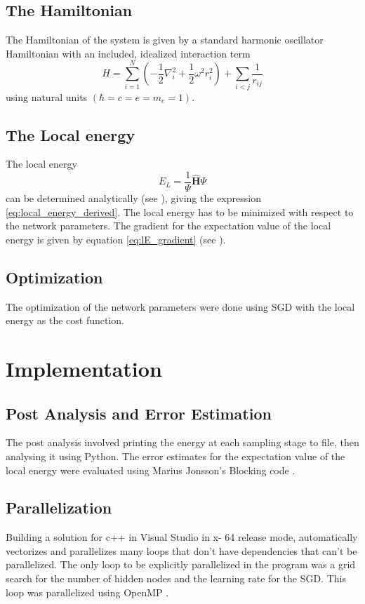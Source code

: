 \documentclass[11pt,a4paper,titlepage]{article}
\begin{document}
\subsection{The Hamiltonian}
The Hamiltonian of the system is given by a standard harmonic oscillator Hamiltonian with an included, idealized interaction term
\begin{equation}\label{eq:hamiltonian}
\hat{H}=\sum_{i=1}^{N}\left(-\frac{1}{2} \nabla_{i}^{2}+\frac{1}{2} \omega^{2} r_{i}^{2}\right)+\sum_{i<j} \frac{1}{r_{i j}}
\end{equation}
using natural units $\left(\hbar=c=e=m_{e}=1\right)$.
\subsection{The Local energy }
The local energy
\begin{equation}
E_{L}=\frac{1}{\Psi} \hat{\mathbf{H}} \Psi
\end{equation}
can be determined analytically (see ), giving the expression \eqref{eq:local_energy_derived}. The local energy has to be minimized with respect to the network parameters. The gradient for the expectation value of the local energy is given by equation \eqref{eq:lE_gradient} (see ).
\subsection{Optimization}
The optimization of the network parameters were done using SGD with the local energy as the cost function.

\section{Implementation}

\subsection{Post Analysis and Error Estimation}
The post analysis involved printing the energy at each sampling stage to file, then analysing it using Python. The error estimates for the expectation value of the local energy were evaluated using Marius Jonsson's Blocking code \cite{PhysRevE.98.043304}.
\subsection{Parallelization}
Building a solution for c++ in Visual Studio in x- 64 release mode, automatically vectorizes and parallelizes many loops that don't have dependencies that can't be parallelized. The only loop to be explicitly parallelized in the program was a grid search for the number of hidden nodes and the learning rate for the SGD. This loop was parallelized using OpenMP \cite{openmp08}. 
\end{document}
